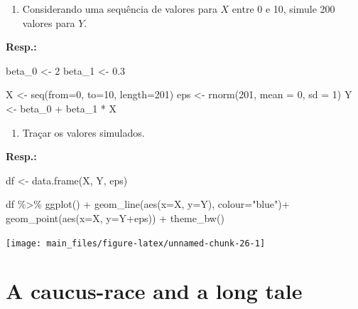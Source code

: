 \documentclass[
]{article}
\newenvironment{Shaded}{\begin{snugshade}}{\end{snugshade}}
\newcommand{\AttributeTok}[1]{\textcolor[rgb]{0.77,0.63,0.00}{#1}}
\newcommand{\DecValTok}[1]{\textcolor[rgb]{0.00,0.00,0.81}{#1}}
\newcommand{\FloatTok}[1]{\textcolor[rgb]{0.00,0.00,0.81}{#1}}
\newcommand{\FunctionTok}[1]{\textcolor[rgb]{0.00,0.00,0.00}{#1}}
\newcommand{\NormalTok}[1]{#1}
\newcommand{\OtherTok}[1]{\textcolor[rgb]{0.56,0.35,0.01}{#1}}
\newcommand{\SpecialCharTok}[1]{\textcolor[rgb]{0.00,0.00,0.00}{#1}}
\newcommand{\StringTok}[1]{\textcolor[rgb]{0.31,0.60,0.02}{#1}}
\providecommand{\tightlist}{%
  \setlength{\itemsep}{0pt}\setlength{\parskip}{0pt}}
\begin{document}
\begin{enumerate}
\def\labelenumi{\arabic{enumi}.}
\tightlist
\item
  Considerando uma sequência de valores para \(X\) entre 0 e 10, simule 200 valores para \(Y\).
\end{enumerate}

\textbf{Resp.:}

\begin{Shaded}
\begin{Highlighting}[]
\NormalTok{beta\_0 }\OtherTok{\textless{}{-}} \DecValTok{2}
\NormalTok{beta\_1 }\OtherTok{\textless{}{-}} \FloatTok{0.3}

\NormalTok{X }\OtherTok{\textless{}{-}} \FunctionTok{seq}\NormalTok{(}\AttributeTok{from=}\DecValTok{0}\NormalTok{, }\AttributeTok{to=}\DecValTok{10}\NormalTok{, }\AttributeTok{length=}\DecValTok{201}\NormalTok{)}
\NormalTok{eps }\OtherTok{\textless{}{-}} \FunctionTok{rnorm}\NormalTok{(}\DecValTok{201}\NormalTok{, }\AttributeTok{mean =} \DecValTok{0}\NormalTok{, }\AttributeTok{sd =} \DecValTok{1}\NormalTok{)}
\NormalTok{Y }\OtherTok{\textless{}{-}}\NormalTok{ beta\_0 }\SpecialCharTok{+}\NormalTok{ beta\_1 }\SpecialCharTok{*}\NormalTok{ X}
\end{Highlighting}
\end{Shaded}

\begin{enumerate}
\def\labelenumi{\arabic{enumi}.}
\setcounter{enumi}{1}
\tightlist
\item
  Traçar os valores simulados.
\end{enumerate}

\textbf{Resp.:}

\begin{Shaded}
\begin{Highlighting}[]
\NormalTok{df }\OtherTok{\textless{}{-}} \FunctionTok{data.frame}\NormalTok{(X, Y, eps)}

\NormalTok{df }\SpecialCharTok{\%\textgreater{}\%}
  \FunctionTok{ggplot}\NormalTok{() }\SpecialCharTok{+}
    \FunctionTok{geom\_line}\NormalTok{(}\FunctionTok{aes}\NormalTok{(}\AttributeTok{x=}\NormalTok{X, }\AttributeTok{y=}\NormalTok{Y), }\AttributeTok{colour=}\StringTok{"blue"}\NormalTok{)}\SpecialCharTok{+}
    \FunctionTok{geom\_point}\NormalTok{(}\FunctionTok{aes}\NormalTok{(}\AttributeTok{x=}\NormalTok{X, }\AttributeTok{y=}\NormalTok{Y}\SpecialCharTok{+}\NormalTok{eps)) }\SpecialCharTok{+}
    \FunctionTok{theme\_bw}\NormalTok{()}
\end{Highlighting}
\end{Shaded}

\texttt{[image: main\_files/figure-latex/unnamed-chunk-26-1]}

\hypertarget{a-caucus-race-and-a-long-tale}{%
\section{A caucus-race and a long tale}\label{a-caucus-race-and-a-long-tale}}
\end{document}
